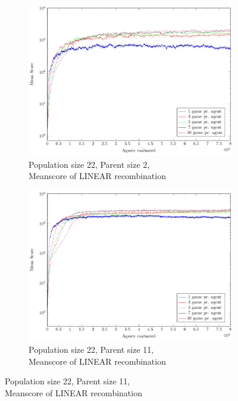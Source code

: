 \begin{figure}
\begin{subfigure}[b]{0.45\textwidth}
    \end{subfigure}
    \begin{subfigure}[b]{0.45\textwidth}
    	\centering
    	\caption{Population size 22, Parent size 2, \\ Meanscore of LINEAR recombination}
        \includegraphics[width=\textwidth]{data/cma_population_offspring/22x_split/linear_l22_o2/mean/PlotFile.pdf}
    \end{subfigure}
    \begin{subfigure}[b]{0.45\textwidth}
    	\centering
    	\caption{Population size 22, Parent size 11, \\ Meanscore of LINEAR recombination}
        \includegraphics[width=\textwidth]{data/cma_population_offspring/22x_split/linear_l22_o11/mean/PlotFile.pdf}

\end{subfigure}
\end{figure}
